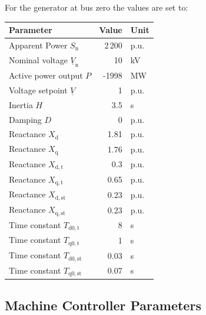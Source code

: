 \vspace*{1cm}

For the generator at bus zero the values are set to:

\begin{tabularx}{\textwidth}{Xrl}
    \textbf{Parameter} & \textbf{Value} & \textbf{Unit} \\ \hline
    \toprule
    Apparent Power $S_\mathrm{n}$ & 2\,200 & p.u. \\
    Nominal voltage $\underline{V}_\mathrm{n}$ & 10 & kV \\
    Active power output $P$ & -1998 & MW \\
    Voltage setpoint $\underline{V}$ & 1 & p.u. \\
    Inertia $H$ & 3.5 & s \\
    Damping $D$ & 0 & p.u. \\
    Reactance $X_\mathrm{d}$ & 1.81 & p.u. \\
    Reactance $X_\mathrm{q}$ & 1.76 & p.u. \\
    Reactance $X_\mathrm{d,t}$ & 0.3 & p.u. \\
    Reactance $X_\mathrm{q,t}$ & 0.65 & p.u. \\
    Reactance $X_\mathrm{d,st}$ & 0.23 & p.u. \\
    Reactance $X_\mathrm{q,st}$ & 0.23 & p.u. \\
    Time constant $T_\mathrm{d0,t}$ & 8 & s \\
    Time constant $T_\mathrm{q0,t}$ & 1 & s \\
    Time constant $T_\mathrm{d0,st}$ & 0.03 & s \\
    Time constant $T_\mathrm{q0,st}$ & 0.07 & s \\
    \bottomrule
\end{tabularx}

\vspace*{1cm}

\subsection{Machine Controller Parameters}
\label{app:machine-controllers}

